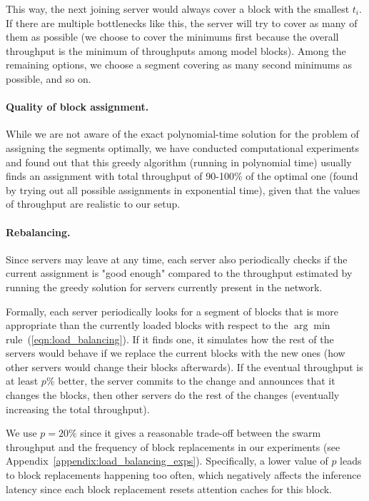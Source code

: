 This way, the next joining server would always cover a block with the smallest $t_i$. If there are multiple bottlenecks like this, the server will try to cover as many of them as possible (we choose to cover the minimums first because the overall throughput is the minimum of throughputs among model blocks). Among the remaining options, we choose a segment covering as many second minimums as possible, and so on.

\paragraph{Quality of block assignment.} While we are not aware of the exact polynomial-time solution for the problem of assigning the segments optimally, we have conducted computational experiments and found out that this greedy algorithm (running in polynomial time) usually finds an assignment with total throughput of 90-100\% of the optimal one (found by trying out all possible assignments in exponential time), given that the values of throughput are realistic to our setup.

\paragraph{Rebalancing.} Since servers may leave at any time, each server also periodically checks if the current assignment is "good enough" compared to the throughput estimated by running the greedy solution for servers currently present in the network.

Formally, each server periodically looks for a segment of blocks that is more appropriate than the currently loaded blocks with respect to the $\arg\min$ rule~(\ref{eqn:load_balancing}). If it finds one, it simulates how the rest of the servers would behave if we replace the current blocks with the new ones (how other servers would change their blocks afterwards). If the eventual throughput is at least $p\%$ better, the server commits to the change and announces that it changes the blocks, then other servers do the rest of the changes (eventually increasing the total throughput).

We use $p=20\%$ since it gives a reasonable trade-off between the swarm throughput and the frequency of block replacements in our experiments (see Appendix~\ref{appendix:load_balancing_exps}). Specifically, a lower value of $p$ leads to block replacements happening too often, which negatively affects the inference latency since each block replacement resets attention caches for this block.

